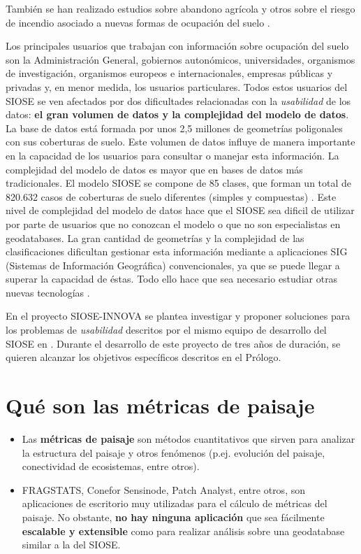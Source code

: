 También se han realizado estudios sobre abandono agrícola \citep{Zaragozi2011} y otros sobre el riesgo de incendio asociado a nuevas formas de ocupación del suelo \citep{Vazquez2017}.

Los principales usuarios que trabajan con información sobre ocupación del suelo son la Administración General, gobiernos autonómicos, universidades, organismos de investigación, organismos europeos e internacionales, empresas públicas y privadas y, en menor medida, los usuarios particulares. Todos estos usuarios del SIOSE se ven afectados por dos dificultades relacionadas con la \textit{usabilidad} de los datos: \textbf{el gran volumen de datos y la complejidad del modelo de datos}. La base de datos está formada por unos 2,5 millones de geometrías poligonales con sus coberturas de suelo. Este volumen de datos influye de manera importante en la capacidad de los usuarios para consultar o manejar esta información. La complejidad del modelo de datos es mayor que en bases de datos más tradicionales. El modelo SIOSE se compone de 85 clases, que forman un total de 820.632 casos de coberturas de suelo diferentes (simples y compuestas) \citep{FernandezVillarino2012}. Este nivel de complejidad del modelo de datos hace que el SIOSE sea dificil de utilizar por parte de usuarios que no conozcan el modelo o que no son especialistas en geodatabases. La gran cantidad de geometrías y la complejidad de las clasificaciones dificultan gestionar esta información mediante a aplicaciones SIG (Sistemas de Información Geográfica) convencionales, ya que se puede llegar a superar la capacidad de éstas. Todo ello hace que sea necesario estudiar otras nuevas tecnologías \citep{NavarroCarrion2016}.

En el proyecto SIOSE-INNOVA se plantea investigar y proponer soluciones para los problemas de \textit{usabilidad} descritos por el mismo equipo de desarrollo del SIOSE en \citet{FernandezVillarino2012}. Durante el desarrollo de este proyecto de tres años de duración, se quieren alcanzar los objetivos específicos descritos en el Prólogo.

\section{Qué son las métricas de paisaje}\label{sec:metrica}

\begin{graybox}
\begin{itemize}
\item Las \textbf{métricas de paisaje} son métodos cuantitativos que sirven para analizar la estructura del paisaje y otros fenómenos (p.ej. evolución del paisaje, conectividad de ecosistemas, entre otros).
\item FRAGSTATS, Conefor Sensinode, Patch Analyst, entre otros, son aplicaciones de escritorio muy utilizadas para el cálculo de métricas del paisaje. No obstante, \textbf{no hay ninguna aplicación} que sea fácilmente \textbf{escalable y extensible} como para realizar análisis sobre una geodatabase similar a la del SIOSE.
\end{itemize}
\end{graybox}


